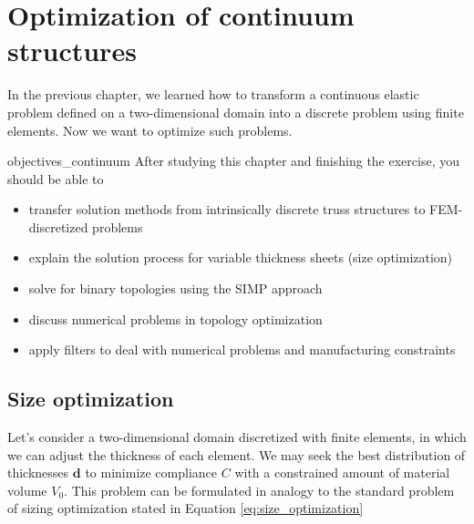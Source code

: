 \chapter{Optimization of continuum structures}
In the previous chapter, we learned how to transform a continuous elastic problem defined on a two-dimensional domain into a discrete problem using finite elements. Now we want to optimize such problems.

\begin{objectives}{}{objectives_continuum}
After studying this chapter and finishing the exercise, you should be able to 
\begin{itemize}[label=$\dots$]
    \item transfer solution methods from intrinsically discrete truss structures to FEM-discretized problems
    \item explain the solution process for variable thickness sheets (size optimization) 
    \item solve for binary topologies using the SIMP approach
    \item discuss numerical problems in topology optimization
    \item apply filters to deal with numerical problems and manufacturing constraints
\end{itemize}
\end{objectives}

\section{Size optimization}
\label{sec:variable_thickness_sheet}
Let's consider a two-dimensional domain discretized with finite elements, in which we can adjust the thickness of each element. We may seek the best distribution of thicknesses $\mathbf{d}$ to minimize compliance $C$ with a constrained amount of material volume $V_0$. This problem can be formulated in analogy to the standard problem of sizing optimization stated in Equation \eqref{eq:size_optimization}

